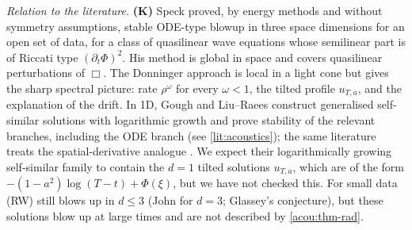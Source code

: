 \emph{Relation to the literature.} \textbf{(K)} Speck \cite{Speck2020}
proved, by energy methods and without symmetry assumptions, stable
ODE-type blowup in three space
dimensions for an open set of data, for a class of quasilinear wave equations
whose semilinear part is of Riccati type $(\partial_t\Phi)^2$. %
His method is global in space and covers quasilinear perturbations of $\Box$.
The Donninger approach is local in a light cone but gives the sharp
spectral picture: rate $\rho^\omega$ for every $\omega<1$, the tilted profile
$u_{T,a}$, and the explanation of the drift. In 1D, Gough \cite{Gough2025}
and Liu--Raees \cite{LiuRaees2025} construct generalised self-similar
solutions with logarithmic growth and prove stability of the relevant
branches, including the ODE branch (see \cref{lit:acoustics}); the same literature
treats the spatial-derivative analogue \cite{GhoulLiuMasmoudi2025}.
We expect their logarithmically growing self-similar family to contain the
$d=1$ tilted solutions $u_{T,a}$, which are of the form
$-(1-a^2)\log(T-t)+\Phi(\xi)$, but we have not checked this. For small data
(RW) still blows up in $d\le3$ (John \cite{John1981} for $d=3$; Glassey's
conjecture), %
 but these solutions blow up at large times and are not
described by \cref{acou:thm-rad}.

